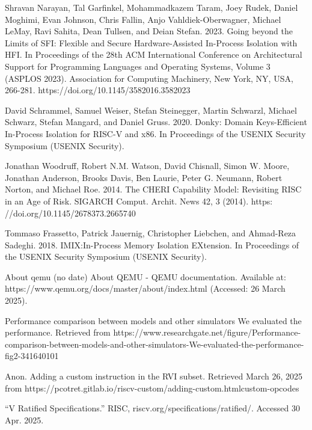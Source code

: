 \documentclass[conference,compsoc]{IEEEtran}
\begin{document}
%
%
%
\begin{thebibliography}{1}

Shravan Narayan, Tal Garfinkel, Mohammadkazem Taram, Joey Rudek, Daniel Moghimi, Evan Johnson, Chris Fallin, Anjo Vahldiek-Oberwagner, Michael LeMay, Ravi Sahita, Dean Tullsen, and Deian Stefan. 2023. Going beyond the Limits of SFI: Flexible and Secure Hardware-Assisted In-Process Isolation with HFI. In Proceedings of the 28th ACM International Conference on Architectural Support for Programming Languages and Operating Systems, Volume 3 (ASPLOS 2023). Association for Computing Machinery, New York, NY, USA, 266-281. https://doi.org/10.1145/3582016.3582023

David Schrammel, Samuel Weiser, Stefan Steinegger, Martin Schwarzl, Michael
Schwarz, Stefan Mangard, and Daniel Gruss. 2020. Donky: Domain Keys-Efficient
In-Process Isolation for RISC-V and x86. In Proceedings of the USENIX Security
Symposium (USENIX Security).

Jonathan Woodruff, Robert N.M. Watson, David Chisnall, Simon W. Moore,
Jonathan Anderson, Brooks Davis, Ben Laurie, Peter G. Neumann, Robert Norton, and Michael Roe. 2014. The CHERI Capability Model: Revisiting RISC
in an Age of Risk. SIGARCH Comput. Archit. News 42, 3 (2014). https:
//doi.org/10.1145/2678373.2665740

Tommaso Frassetto, Patrick Jauernig, Christopher Liebchen, and Ahmad-Reza
Sadeghi. 2018. IMIX:In-Process Memory Isolation EXtension. In Proceedings of
the USENIX Security Symposium (USENIX Security).

About qemu (no date) About QEMU - QEMU documentation. Available at: https://www.qemu.org/docs/master/about/index.html (Accessed: 26 March 2025). 

Performance comparison between models and other simulators We evaluated the performance. Retrieved from https://www.researchgate.net/figure/Performance-comparison-between-models-and-other-simulators-We-evaluated-the-performance-fig2-341640101

Anon. Adding a custom instruction in the RVI subset. Retrieved March 26, 2025 from https://pcotret.gitlab.io/riscv-custom/adding-custom.htmlcustom-opcodes 

“V Ratified Specifications.” RISC, riscv.org/specifications/ratified/. Accessed 30 Apr. 2025. 

\end{thebibliography}




\end{document}
